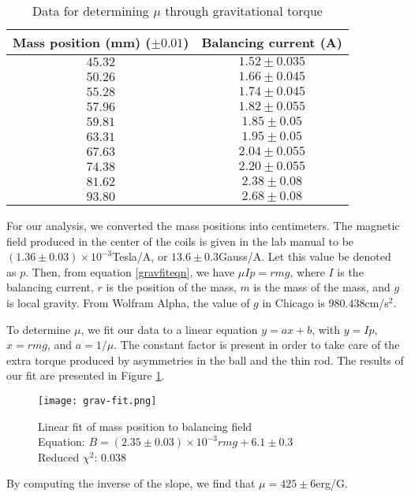 \documentclass{amsart}
\numberwithin{equation}{section}
\begin{document}
\begin{table}
\caption{Data for determining $\mu$ through gravitational torque}
\label{gravdata}
\begin{tabular}[t]{|c|c|}
\hline
Mass position (mm) ($\pm0.01$) & Balancing current (A)\\
\hline
$45.32$ & $1.52\pm0.035$\\
$50.26$ & $1.66\pm0.045$\\
$55.28$ & $1.74\pm0.045$\\
$57.96$ & $1.82\pm0.055$\\
$59.81$ & $1.85\pm0.05$\\
$63.31$ & $1.95\pm0.05$\\
$67.63$ & $2.04\pm0.055$\\
$74.38$ & $2.20\pm0.055$\\
$81.62$ & $2.38\pm0.08$\\
$93.80$ & $2.68\pm0.08$\\
\hline
\end{tabular}
\end{table}

For our analysis, we converted the mass positions into centimeters. The magnetic field produced in the center of the coils is given in the lab manual to be $(1.36\pm0.03)\times10^{-3}$Tesla/A, or $13.6\pm0.3$Gauss/A. Let this value be denoted as $p$. Then, from equation \ref{gravfiteqn}, we have $\mu Ip=rmg$, where $I$ is the balancing current, $r$ is the position of the mass, $m$ is the mass of the mass, and $g$ is local gravity. From Wolfram Alpha, the value of $g$ in Chicago is $980.438$cm/s$^2$. 

To determine $\mu$, we fit our data to a linear equation $y=ax+b$, with $y=Ip$, $x=rmg$, and $a=1/\mu$. The constant factor is present in order to take care of the extra torque produced by asymmetries in the ball and the thin rod. The results of our fit are presented in Figure \ref{gravfit}.

\begin{figure}
\center
\texttt{[image: grav-fit.png]}
\caption{Linear fit of mass position to balancing field\\Equation: $B=(2.35\pm0.03)\times10^{-3}rmg+6.1\pm0.3$\\Reduced $\chi^2$: $0.038$}
\label{gravfit}
\end{figure}

By computing the inverse of the slope, we find that $\mu=425\pm6$erg/G. 
\end{document}
